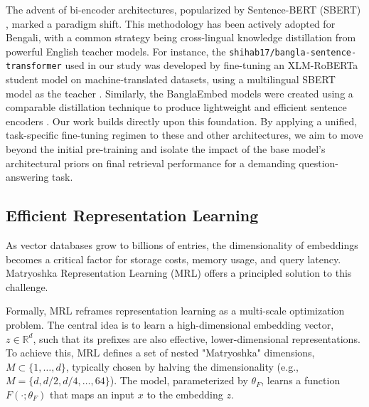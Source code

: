 \documentclass[manuscript,screen,review]{acmart}
\begin{document}
The advent of bi-encoder architectures, popularized by Sentence-BERT (SBERT) \cite{reimers2019sentence}, marked a paradigm shift. This methodology has been actively adopted for Bengali, with a common strategy being cross-lingual knowledge distillation from powerful English teacher models. For instance, the \texttt{shihab17/bangla-sentence-transformer} used in our study was developed by fine-tuning an XLM-RoBERTa student model on machine-translated datasets, using a multilingual SBERT model as the teacher \cite{uddin2024bangla}. Similarly, the BanglaEmbed models were created using a comparable distillation technique to produce lightweight and efficient sentence encoders \cite{kabir2024banglaembed}. Our work builds directly upon this foundation. By applying a unified, task-specific fine-tuning regimen to these and other architectures, we aim to move beyond the initial pre-training and isolate the impact of the base model's architectural priors on final retrieval performance for a demanding question-answering task.

\subsection{Efficient Representation Learning}
As vector databases grow to billions of entries, the dimensionality of embeddings becomes a critical factor for storage costs, memory usage, and query latency. Matryoshka Representation Learning (MRL) \cite{kusupati2022matryoshka} offers a principled solution to this challenge.

Formally, MRL reframes representation learning as a multi-scale optimization problem. The central idea is to learn a high-dimensional embedding vector, $z \in \mathbb{R}^d$, such that its prefixes are also effective, lower-dimensional representations. To achieve this, MRL defines a set of nested "Matryoshka" dimensions, $M \subset \{1, \dots, d\}$, typically chosen by halving the dimensionality (e.g., $M = \{d, d/2, d/4, \dots, 64\}$). The model, parameterized by $\theta_F$, learns a function $F(\cdot; \theta_F)$ that maps an input $x$ to the embedding $z$.
\end{document}

